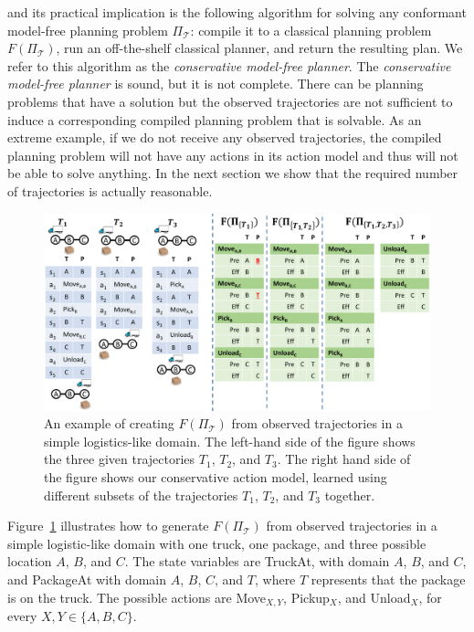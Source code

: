 \documentclass{article}
\newcommand{\cmfp}{conformant model-free planning}
\begin{document}
	and its practical implication is the following algorithm for solving 
	any \cmfp{} problem $\Pi_\mathcal{T}$: compile it to a classical planning problem 
	$F(\Pi_\mathcal{T})$, run an off-the-shelf classical planner, and return the resulting plan. 
	We refer to this algorithm as the {\em conservative model-free planner}. 	
	The {\em conservative model-free planner} is sound, but it is not complete. 
	There can be planning problems 
	that have a solution but the observed trajectories are not sufficient 
	to induce a corresponding compiled planning problem that is solvable. 
	As an extreme example, if we do not receive any observed trajectories, 
	the compiled planning problem will not have any actions in its action model
	and thus will not be able to solve anything. 
	In the next section we show that the required number of trajectories is actually reasonable. 
	
	
	\begin{figure}
		\includegraphics[width=\textwidth]{example_cropped.pdf}
	\caption{An example of creating $F(\Pi_{\mathcal{T}})$ from observed trajectories in a simple logistics-like domain. The left-hand side of the figure shows the three given trajectories $T_1$, $T_2$, and $T_3$. The right hand side of the figure shows our conservative action model, 
		learned using different subsets of the trajectories $T_1$, $T_2$, and $T_3$ together.}
	\label{fig:example}
	\end{figure}
	
	
	
	Figure~\ref{fig:example} illustrates how to generate  $F(\Pi_{\mathcal{T}})$ from observed trajectories in a simple logistic-like domain with one truck, one package, and three possible location $A$, $B$, and $C$. The state variables are TruckAt, with domain $A$, $B$, and $C$, and PackageAt with domain $A$, $B$, $C$, and $T$, where $T$ represents that the package is on the truck. The possible actions are Move$_{X,Y}$, 
	Pickup$_X$, and Unload$_X$, for every $X,Y\in \{A,B,C\}$. 
	
\end{document}
